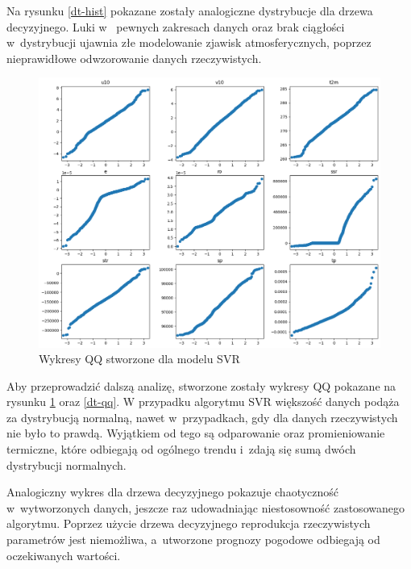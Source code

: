 Na rysunku \ref{dt-hist} pokazane zostały analogiczne dystrybucje dla drzewa decyzyjnego. Luki w~
pewnych zakresach danych oraz brak ciągłości w~dystrybucji ujawnia złe modelowanie zjawisk atmosferycznych,
poprzez nieprawidłowe odwzorowanie danych rzeczywistych. 

\begin{figure}[H]
    \centering
    \includegraphics[width=\textwidth]{images/svr_qq.png}
    \caption[Wykresy Q-Q dla SVR]{Wykresy QQ stworzone dla modelu SVR}
    \label{svr-qq}
\end{figure}

Aby przeprowadzić dalszą analizę, stworzone zostały wykresy QQ pokazane na rysunku \ref{svr-qq} oraz \ref{dt-qq}.
W przypadku algorytmu SVR większość danych podąża za dystrybucją normalną, nawet w~przypadkach,
gdy dla danych rzeczywistych nie było to prawdą. Wyjątkiem od tego są odparowanie oraz promieniowanie 
termiczne, które odbiegają od ogólnego trendu i~zdają się sumą dwóch dystrybucji normalnych.

Analogiczny wykres dla drzewa decyzyjnego pokazuje chaotyczność w~wytworzonych danych, jeszcze raz 
udowadniając niestosowność zastosowanego algorytmu. Poprzez użycie drzewa decyzyjnego reprodukcja
rzeczywistych parametrów jest niemożliwa, a~utworzone prognozy pogodowe odbiegają od oczekiwanych wartości.


